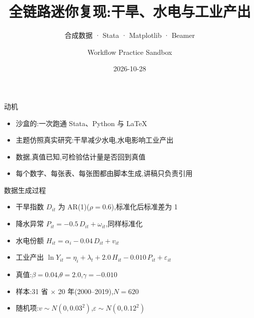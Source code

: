\documentclass{beamer}
\title{全链路迷你复现:干旱、水电与工业产出}
\subtitle{合成数据 · Stata · Matplotlib · Beamer}
\author{Workflow Practice Sandbox}
\date{2026-10-28 \quad \muted{练习沙盒 · 合成数据}}
\begin{document}
\frame{\titlepage}

\begin{frame}{动机}
  \begin{itemize}
    \item 沙盒的:一次跑通 Stata、Python 与 \LaTeX
    \item 主题仿照真实研究:干旱减少水电,水电影响工业产出
    \item 数据,真值已知,可检验估计量是否回到真值
    \item 每个数字、每张表、每张图都由脚本生成,讲稿只负责引用
  \end{itemize}
\end{frame}

\begin{frame}{数据生成过程}
  \begin{itemize}
    \item 干旱指数 $D_{it}$ 为 AR(1)($\rho = 0.6$),标准化后标准差为 1
    \item 降水异常 $P_{it} = -0.5\,D_{it} + \omega_{it}$,同样标准化
    \item 水电份额 $H_{it} = \alpha_i - 0.04\,D_{it} + v_{it}$
    \item 工业产出 $\ln Y_{it} = \eta_i + \lambda_t + 2.0\,H_{it} - 0.010\,P_{it} + \varepsilon_{it}$
  \end{itemize}
  \vspace{0.3em}
  \begin{itemize}
    \item 真值:$\beta = 0.04$,$\theta = 2.0$,$\gamma = -0.010$
    \item 样本:31 省 $\times$ 20 年(2000--2019),$N = 620$
    \item 随机项:$v \sim N(0, 0.03^2)$,$\varepsilon \sim N(0, 0.12^2)$
  \end{itemize}
\end{frame}
\end{document}
